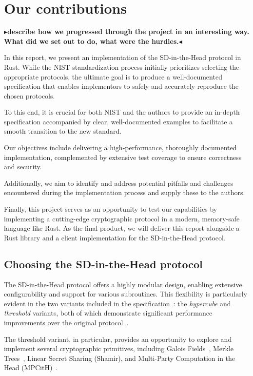 \documentclass[twoside,11pt]{report}
\theoremstyle{definition}
\theoremstyle{plain}
\newcommand{\todo}[1]{{\color[rgb]{.5,0,0}\textbf{$\blacktriangleright$#1$\blacktriangleleft$}}}
\begin{document}
\section{Our contributions}

\todo{describe how we progressed through the project in an interesting way. What did we set out to do, what were the hurdles.}

In this report, we present an implementation of the SD-in-the-Head protocol in Rust. While the NIST standardization process initially prioritizes selecting the appropriate protocols, the ultimate goal is to produce a well-documented specification that enables implementors to safely and accurately reproduce the chosen protocols.

To this end, it is crucial for both NIST and the authors to provide an in-depth specification accompanied by clear, well-documented examples to facilitate a smooth transition to the new standard.

Our objectives include delivering a high-performance, thoroughly documented implementation, complemented by extensive test coverage to ensure correctness and security.

Additionally, we aim to identify and address potential pitfalls and challenges encountered during the implementation process and supply these to the authors.

Finally, this project serves as an opportunity to test our capabilities by implementing a cutting-edge cryptographic protocol in a modern, memory-safe language like Rust. As the final product, we will deliver this report alongside a Rust library and a client implementation for the SD-in-the-Head protocol.


\subsection{Choosing the SD-in-the-Head protocol}
The SD-in-the-Head protocol offers a highly modular design, enabling extensive configurability and support for various subroutines. This flexibility is particularly evident in the two variants included in the specification~\cite{aguilarsyndrome11}: the \textit{hypercube} and \textit{threshold} variants, both of which demonstrate significant performance improvements over the original protocol~\cite{feneuil2022syndrome,aguilar2023return,feneuil2023threshold}.

The threshold variant, in particular, provides an opportunity to explore and implement several cryptographic primitives, including Galois Fields~\cite{brownadvanced}, Merkle Trees~\cite{becker2008merkle}, Linear Secret Sharing (Shamir), and Multi-Party Computation in the Head (MPCitH)~\cite{baum2020concretely}.
\end{document}
